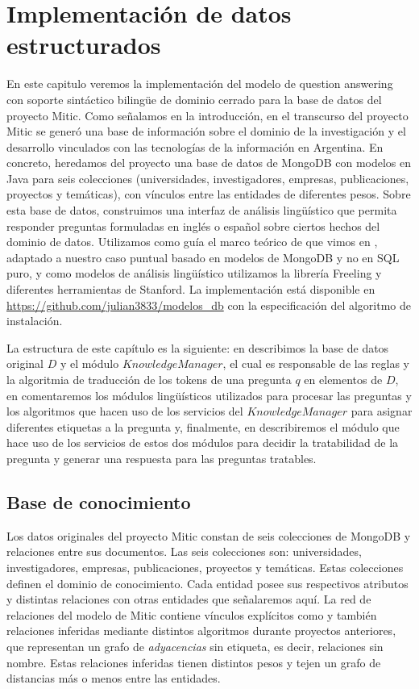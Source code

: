 \chapter{Implementación de datos estructurados}
\label{chap:4}
\horrible
En este capitulo veremos la implementación del modelo de question answering con soporte sintáctico bilingüe de dominio cerrado para la base de datos del proyecto Mitic. Como señalamos en la introducción, en el transcurso del proyecto Mitic se generó una base de información sobre el dominio de la investigación y el desarrollo vinculados con las tecnologías de la información en Argentina. En concreto, heredamos del proyecto una base de datos de MongoDB con modelos en Java para seis colecciones (universidades, investigadores, empresas, publicaciones, proyectos y temáticas), con vínculos entre las entidades de diferentes pesos. Sobre esta base de datos, construimos una interfaz de análisis lingüístico que permita responder preguntas formuladas en inglés o español sobre ciertos hechos del dominio de datos. Utilizamos como guía el marco teórico de \cite{QADB1} que vimos en , adaptado a nuestro caso puntual basado en modelos de MongoDB y no en SQL puro, y como modelos de análisis lingüístico utilizamos la librería Freeling y diferentes herramientas de Stanford. La implementación está disponible en \url{https://github.com/julian3833/modelos_db} con la especificación del algoritmo de instalación. 

La estructura de este capítulo es la siguiente: en  describimos la base de datos original $D$ y el módulo $KnowledgeManager$, el cual es responsable de las reglas y la algoritmia de traducción de los tokens de una pregunta $q$ en elementos de $D$, en  comentaremos los módulos lingüísticos utilizados para procesar las preguntas y los algoritmos que hacen uso de los servicios del $KnowledgeManager$ para asignar diferentes etiquetas a la pregunta y, finalmente, en  describiremos el módulo que hace uso de los servicios de estos dos módulos para decidir la tratabilidad de la pregunta y generar una respuesta para las preguntas tratables.

\section{Base de conocimiento}
\label{sec:grafo-mitic}

Los datos originales del proyecto Mitic constan de seis colecciones de MongoDB y relaciones entre sus documentos. Las seis colecciones son: universidades, investigadores, empresas, publicaciones, proyectos y temáticas. Estas colecciones definen el dominio de conocimiento. Cada entidad posee sus respectivos atributos y distintas relaciones con otras entidades que señalaremos aquí. La red de relaciones del modelo de Mitic contiene vínculos explícitos como  y también relaciones inferidas mediante distintos algoritmos durante proyectos anteriores, que representan un grafo de \textit{adyacencias} sin etiqueta, es decir, relaciones sin nombre. Estas relaciones inferidas tienen distintos pesos  y tejen un grafo de distancias más o menos  entre las entidades. 

